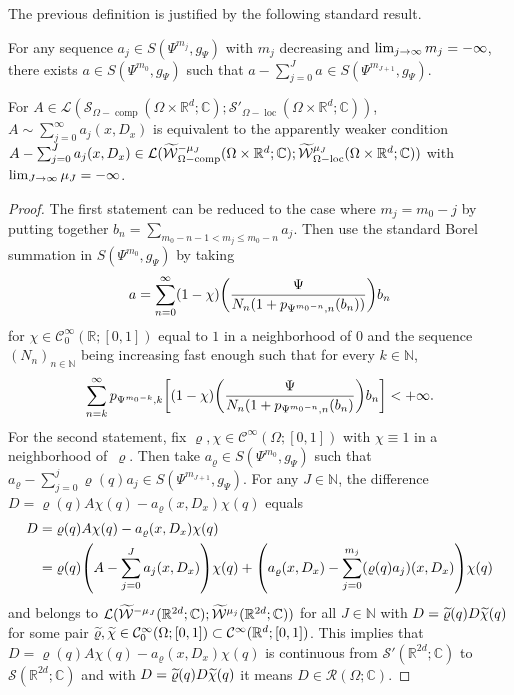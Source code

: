 \documentclass[AHL,Unicode,longabstracts]{cedram}
\newcommand{\C}{\mathbb{C}}
\newcommand{\R}{\mathbb{R}}
\newcommand{\N}{\mathbb{N}}
\newcommand{\clW}{\mathcal{W}}
\newcommand{\clC}{\mathcal{C}}
\newcommand{\clS}{\mathcal{S}}
\newcommand{\clL}{\mathcal{L}}
\newcommand{\clR}{\mathcal{R}}
\DeclareMathOperator{\ccomp}{comp}
\DeclareMathOperator{\locc}{loc}
\let\oldtilde\tilde
\renewcommand*{\tilde}[1]{\mathchoice{\widetilde{#1}}{\widetilde{#1}}{\oldtilde{#1}}{\oldtilde{#1}}}
\let\originalleft\left
\let\originalright\right
\renewcommand{\left}{\mathopen{}\mathclose\bgroup\originalleft}
\renewcommand{\right}{\aftergroup\egroup\originalright}
\renewcommand*{\to}{\mathchoice{\longrightarrow}{\rightarrow}{\rightarrow}{\rightarrow}}
\begin{document}
The previous definition is justified by the following standard result.
\begin{prop}\label{pr:asympsum}
For any sequence $a_{j}\in S(\Psi^{m_{j}},g_{\Psi})$ with $m_{j}$ decreasing and $\lim_{j\to\infty}m_{j}=-\infty$, there exists $a\in S(\Psi^{m_{0}},g_{\Psi})$ such that $a-\sum_{j=0}^{J}a_{}\in S(\Psi^{m_{J+1}},g_{\Psi})$.

For $A\in \clL(\clS_{\Omega-\ccomp}(\Omega\times\R^{d};\C);\clS'_{\Omega-\locc}(\Omega\times\R^{d};\C))$, $A\sim \sum_{j=0}^{\infty}a_{j}(x,D_{x})$ is equivalent to the apparently weaker condition $A-\sum_{j=0}^{J}a_{j}(x,D_{x})\in \clL(\tilde{\clW}^{-\mu_{J}}_{\Omega-\ccomp}(\Omega\times\R^{d};\C);\tilde{\clW}^{\mu_{J}}_{\Omega-\locc}(\Omega\times\R^{d};\C))$ with $\lim_{J\to\infty}\mu_{J}=-\infty$.
\end{prop}

\begin{proof}
The first statement can be reduced to the case where $m_{j}=m_{0}-j$ by putting together $b_{n}=\sum_{m_{0}-n-1<m_{j}\leq m_{0}-n}a_{j}$. Then use the standard Borel summation in $S(\Psi^{m_{0}},g_{\Psi})$ by taking
\[
a=\sum_{n=0}^{\infty}(1-\chi)\left(\frac{\Psi}{N_{n}(1+p_{\Psi^{m_{0}-n},n}(b_{n}))}\right) b_{n}
\]
for $\chi\in \clC^{\infty}_{0}(\R;[0,1])$ equal to $1$ in a neighborhood of $0$ and the sequence $(N_{n})_{n\in \N}$ being increasing fast enough such that for every $k\in \N$,
\[
\sum_{n=k}^{\infty}p_{\Psi^{m_{0}-k},k}\left[(1-\chi)\left(\frac{\Psi}{N_{n}(1+p_{\Psi^{m_{0}-n},n}(b_{n})}\right)b_{n}\right]<+\infty.
\]
For the second statement, fix $\varrho,\chi\in \clC^{\infty}(\Omega;[0,1])$ with $\chi\equiv 1$ in a neighborhood of~$\varrho$. Then take $a_{\varrho}\in S(\Psi^{m_{0}},g_{\Psi})$ such that $a_{\varrho}-\sum_{j=0}^{j}\varrho(q)a_{j}\in S(\Psi^{m_{J+1}},g_{\Psi})$. For any $J\in \N$, the difference $D=\varrho(q)A\chi(q)-a_{\varrho}(x,D_{x})\chi(q)$ equals
\begin{align*}
D&=\varrho(q)A \chi(q)-a_{\varrho}(x,D_{x})\chi(q)
\\ &=\varrho(q)
\left(A-\sum_{j=0}^{J}a_{j}(x,D_{x})\right)\chi(q)+\left(a_{\varrho}(x,D_{x})-\sum_{j=0}^{m_{j}}(\varrho(q)a_{j})(x,D_{x})\right)\chi(q)
\end{align*}
and belongs to $\clL(\tilde{\clW}^{-\mu_{J}}(\R^{2d};\C);\tilde{\clW}^{\mu_{j}}(\R^{2d};\C))$ for all $J\in \N$ with $D=\tilde{\varrho}(q)D\tilde{\chi}(q)$ for some pair $\tilde{\varrho},\tilde{\chi}\in \clC^{\infty}_{0}(\Omega;[0,1])\subset \clC^{\infty}(\R^{d};[0,1])$. This implies that $D=\varrho(q)A\chi(q)-a_{\varrho}(x,D_{x})\chi(q)$ is continuous from $\clS'(\R^{2d};\C)$ to $\clS(\R^{2d};\C)$ and with $D=\tilde{\varrho}(q)D\tilde{\chi}(q)$ it means $D\in \clR(\Omega;\C)$.
\end{proof}
\end{document}
